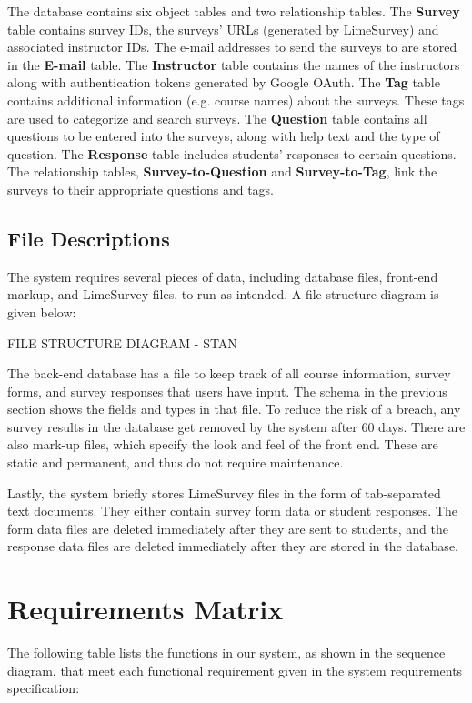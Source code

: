 \documentclass{article}
\begin{document}
The database contains six object tables and two relationship tables. The \textbf{Survey} table contains survey IDs, the surveys' URLs (generated by LimeSurvey) and associated instructor IDs. The e-mail addresses to send the surveys to are stored in the \textbf{E-mail} table. The \textbf{Instructor} table contains the names of the instructors along with authentication tokens generated by Google OAuth. The \textbf{Tag} table contains additional information (e.g. course names) about the surveys. These tags are used to categorize and search surveys. The \textbf{Question} table contains all questions to be entered into the surveys, along with help text and the type of question. The \textbf{Response} table includes students' responses to certain questions. The relationship tables, \textbf{Survey-to-Question} and \textbf{Survey-to-Tag}, link the surveys to their appropriate questions and tags.

\subsection{File Descriptions}

The system requires several pieces of data, including database files, front-end markup, and LimeSurvey files, to run as intended. A file structure diagram is given below:

FILE STRUCTURE DIAGRAM - STAN

The back-end database has a file to keep track of all course information, survey forms, and survey responses that users have input. The schema in the previous section shows the fields and types in that file. To reduce the risk of a breach, any survey results in the database get removed by the system after 60 days. There are also mark-up files, which specify the look and feel of the front end. These are static and permanent, and thus do not require maintenance.

Lastly, the system briefly stores LimeSurvey files in the form of tab-separated text documents. They either contain survey form data or student responses. The form data files are deleted immediately after they are sent to students, and the response data files are deleted immediately after they are stored in the database.

\section{Requirements Matrix}

The following table lists the functions in our system, as shown in the sequence diagram, that meet each functional requirement given in the system requirements specification:
\end{document}
